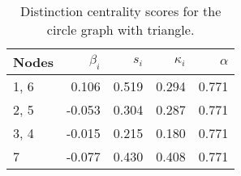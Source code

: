 \begin{table}
\centering
\caption{\label{tab:circletriangle}Distinction centrality scores for the circle graph with triangle.}
\centering
\begin{tabular}[t]{lrrrr}
\toprule
Nodes & $\beta_i$ & $s_i$ & $\kappa_i$ & $\alpha$\\
\midrule
1, 6 & 0.106 & 0.519 & 0.294 & 0.771\\
2, 5 & -0.053 & 0.304 & 0.287 & 0.771\\
3, 4 & -0.015 & 0.215 & 0.180 & 0.771\\
7 & -0.077 & 0.430 & 0.408 & 0.771\\
\bottomrule
\end{tabular}
\end{table}
